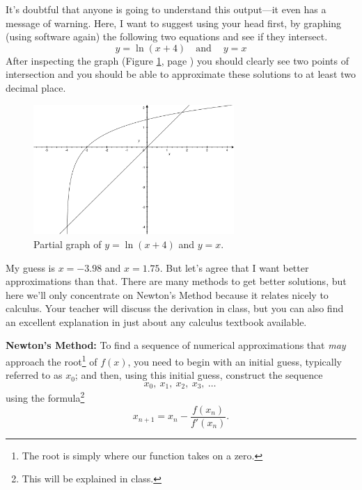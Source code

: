 \documentclass[12pt,addpoints, answers, fleqn]{exam}
\begin{document}
It's doubtful that anyone is going to understand this output---it even has a message of warning. Here, I want to suggest using your head first, by graphing (using software again) the following two equations and see if they intersect.
\[
y = \ln \left( x + 4 \right) \quad \text{and} \quad \ y = x
\]
After inspecting the graph (Figure \ref{fig:NM2501}, page \pageref{fig:NM2501}) you should clearly see two points of intersection and you should be able to approximate these solutions to at least  two decimal place.
\begin{figure}[htbp] %
   \centering
   \includegraphics[width=3in]{./graphics/graph2501.pdf} 
   \caption{Partial graph of $y = \ln \left( x + 4 \right)$ and $y = x$.}
   \label{fig:NM2501}
\end{figure}
My guess is $x=-3.98$ and $x = 1.75$. But let's agree that I want better approximations than that. There are many methods to get better solutions, but here we'll only concentrate on Newton's Method because it relates nicely to calculus. Your teacher will discuss the derivation in class, but you can also find an excellent explanation in just about any calculus textbook available.


\textbf{Newton's Method:} To find a sequence of numerical approximations that \emph{may} approach the root\footnote{The root is simply where our function takes on a zero.} of $f\left(x\right)$, you need to begin with an initial guess, typically referred to as $x_0$; and then, using this initial guess, construct the sequence
\[
x_0, \ x_1, \ x_2, \ x_3, \ \dots \ 
\]
using the formula\footnote{This will be explained in class.}
\[
x_{n+1} = x_n - \frac{f\left( x_n \right)}{f'\left( x_n \right)}.
\]
\end{document}
